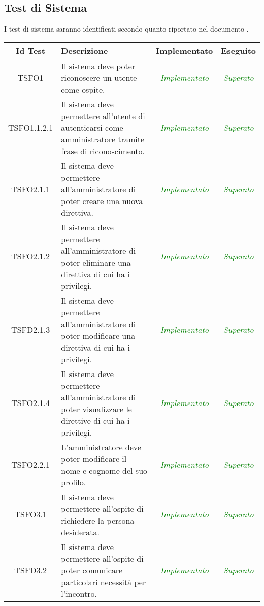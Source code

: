 \subsection{Test di Sistema}
I test di sistema saranno identificati secondo quanto riportato nel documento \NPdoc{}.
\normalsize
\begin{longtable}{|c|>{}m{8cm}|c|c|}
\hline
\textbf{Id Test} & \textbf{Descrizione} & \textbf{Implementato} & \textbf{Eseguito}\\
\hline
\endhead
\hypertarget{TSFO1}{TSFO1} & Il sistema deve poter riconoscere un utente come ospite. &		\textcolor{green}{\textit{Implementato}} & \textcolor{green}{\textit{Superato}}\\ \hline
\hypertarget{TSFO1.1.2.1}{TSFO1.1.2.1} & Il sistema deve permettere all'utente di autenticarsi come amministratore tramite frase di riconoscimento. &		\textcolor{green}{\textit{Implementato}} & \textcolor{green}{\textit{Superato}}\\ \hline
\hypertarget{TSFO2.1.1}{TSFO2.1.1} & Il sistema deve permettere all'amministratore di poter creare una nuova direttiva. &		\textcolor{green}{\textit{Implementato}} & \textcolor{green}{\textit{Superato}}\\ \hline
\hypertarget{TSFO2.1.2}{TSFO2.1.2} & Il sistema deve permettere all'amministratore di poter eliminare una direttiva di cui ha i privilegi. &		\textcolor{green}{\textit{Implementato}} & \textcolor{green}{\textit{Superato}}\\ \hline
\hypertarget{TSFD2.1.3}{TSFD2.1.3} & Il sistema deve permettere all'amministratore di poter modificare una direttiva di cui ha i privilegi. &		\textcolor{green}{\textit{Implementato}} & \textcolor{green}{\textit{Superato}}\\ \hline
\hypertarget{TSFO2.1.4}{TSFO2.1.4} & Il sistema deve permettere all'amministratore di poter visualizzare le direttive di cui ha i privilegi. &		\textcolor{green}{\textit{Implementato}} & \textcolor{green}{\textit{Superato}}\\ \hline
\hypertarget{TSFO2.2.1}{TSFO2.2.1} & L'amministratore deve poter modificare il nome e cognome del suo profilo. &		\textcolor{green}{\textit{Implementato}} & \textcolor{green}{\textit{Superato}}\\ \hline
\hypertarget{TSFO3.1}{TSFO3.1} & Il sistema deve permettere all'ospite di richiedere la persona desiderata. &		\textcolor{green}{\textit{Implementato}} & \textcolor{green}{\textit{Superato}}\\ \hline
\hypertarget{TSFD3.2}{TSFD3.2} & Il sistema deve permettere all'ospite di poter comunicare particolari necessità per l'incontro. &		\textcolor{green}{\textit{Implementato}} & \textcolor{green}{\textit{Superato}}\\ \hline

\end{longtable}
